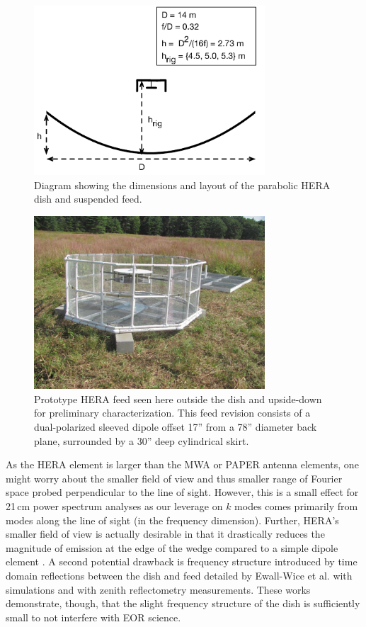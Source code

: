 \documentclass{emulateapj}
\begin{document}
\begin{figure}[h]
\includegraphics[width=3.4in]{dish_and_feed_diagram.pdf}
\caption{Diagram showing the dimensions and layout of the parabolic HERA dish and suspended feed.}
\label{fig:feeddiagram}
\end{figure}

\begin{figure}[h]
\includegraphics[width=3.4in]{feed.pdf}
\caption{Prototype HERA feed seen here outside the dish and upside-down for preliminary characterization. This feed revision consists of a dual-polarized sleeved dipole offset 17'' from a 78'' diameter back plane, surrounded by a 30'' deep cylindrical skirt.}
\label{fig:feedphoto}
\end{figure}

As the HERA element is larger than the MWA or PAPER antenna elements, one might worry about the  smaller field of view and thus smaller range of Fourier space probed perpendicular to the line of sight. However, this is a 
small effect for 21\,cm power spectrum analyses as our leverage on $k$ modes comes primarily from modes along the line of sight (in the frequency dimension). Further, HERA's smaller field of view is actually desirable in that it drastically reduces the magnitude of emission at the edge of the wedge compared to a simple dipole element \citep{nithya15}. A second potential drawback is frequency structure introduced by time domain reflections between the dish and feed detailed by Ewall-Wice et al. \citep{ewallwice16} with simulations and \citep{patra16} with zenith reflectometry measurements. These works demonstrate, though, that the slight frequency structure of the dish is sufficiently small to not interfere with EOR science.
\end{document}
